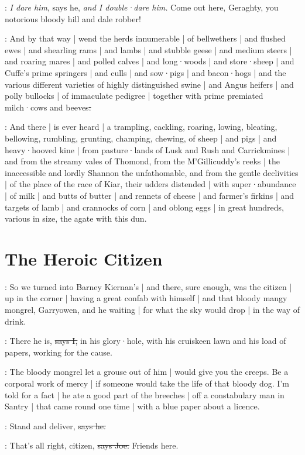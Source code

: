 \Nq:
\emph{I dare him},
says he,
\emph{and I double·dare him.}
Come out here,
Geraghty,
you notorious bloody hill and dale robber!

:
And by that way |
wend the herds innumerable |
of bellwethers |
and flushed ewes |
and shearling rams |
and lambs |
and stubble geese |
and medium steers |
and roaring mares |
and polled calves |
and long·woods |
and store·sheep |
and Cuffe's prime springers |
and culls |
and sow·pigs |
and bacon·hogs |
and the various different varieties of highly distinguished swine |
and Angus heifers |
and polly bullocks |
of immaculate pedigree |
together with prime premiated milch·cows and beeves\sout{:}

:
And there |
is ever heard |
a trampling,
cackling,
roaring,
lowing,
bleating,
bellowing,
rumbling,
grunting,
champing,
chewing,
of sheep |
and pigs |
and heavy·hooved kine |
from pasture·lands of Lusk and Rush and Carrickmines |
and from the streamy vales of Thomond,
from the M'Gillicuddy's reeks |
the inaccessible and lordly Shannon the unfathomable,
and from the gentle declivities |
of the place of the race of Kiar,
their udders distended |
with super·abundance |
of milk |
and butts of butter |
and rennets of cheese |
and farmer's firkins |
and targets of lamb |
and crannocks of corn |
and oblong eggs |
in great hundreds,
various in size,
the agate with this dun.


\section{The Heroic Citizen}

\Nq:
So we turned into Barney Kiernan's |
and there,
sure enough,
was the citizen |
up in the corner |
having a great confab with himself |
and that bloody mangy mongrel,
Garryowen,
and he waiting |
for what the sky would drop |
in the way of drink.

:
There he is,
\sout{says I,}
in his glory·hole,
with his cruiskeen lawn and his load of papers,
working for the cause.

\Nq:
The bloody mongrel let a grouse out of him |
would give you the creeps.
Be a corporal work of mercy |
if someone would take the life of that bloody dog.
I'm told for a fact |
he ate a good part of the breeches |
off a constabulary man in Santry |
that came round one time |
with a blue paper about a licence.

\citizen:
Stand and deliver,
\sout{says he.}

\joe:
That's all right,
citizen,
\sout{says Joe.}
Friends here.

